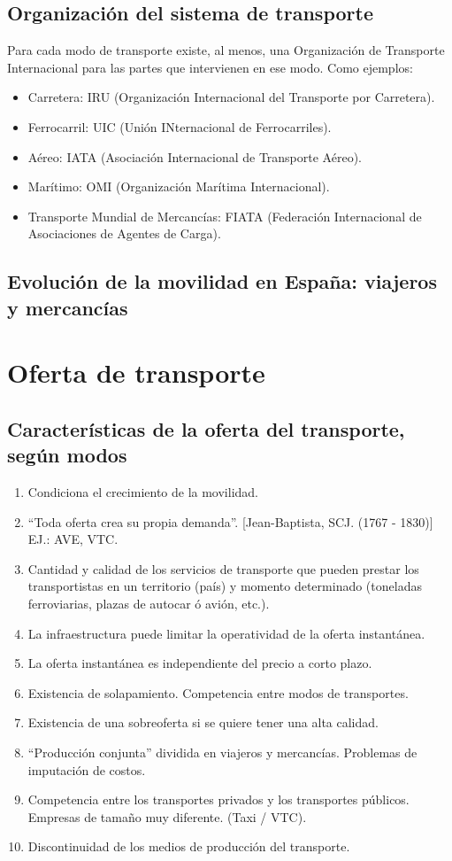 \subsection{Organización del sistema de transporte}
Para cada modo de transporte existe, al menos, una Organización de Transporte Internacional para las partes que intervienen en ese modo. Como ejemplos:
\begin{itemize}
    \item Carretera: IRU (Organización Internacional del Transporte por Carretera).
    \item Ferrocarril: UIC (Unión INternacional de Ferrocarriles).
    \item Aéreo: IATA (Asociación Internacional de Transporte Aéreo).
    \item Marítimo: OMI (Organización Marítima Internacional).
    \item Transporte Mundial de Mercancías: FIATA (Federación Internacional de Asociaciones de Agentes de Carga).
\end{itemize}

\subsection{Evolución de la movilidad en España: viajeros y mercancías}

\section{Oferta de transporte}
\subsection{Características de la oferta del transporte, según modos}
\begin{enumerate}
    \item Condiciona el crecimiento de la movilidad.
    \item ``Toda oferta crea su propia demanda''. [Jean-Baptista, SCJ. (1767 - 1830)] EJ.: AVE, VTC.
    \item Cantidad y calidad de los servicios de transporte que pueden prestar los transportistas en un territorio (país) y momento determinado (toneladas ferroviarias, plazas de autocar ó avión, etc.).
    \item La infraestructura puede limitar la operatividad de la oferta instantánea.
    \item La oferta instantánea es independiente del precio a corto plazo.
    \item Existencia de solapamiento. Competencia entre modos de transportes.
    \item Existencia de una sobreoferta si se quiere tener una alta calidad.
    \item ``Producción conjunta'' dividida en viajeros y mercancías. Problemas de imputación de costos.
    \item Competencia entre los transportes privados y los transportes públicos. Empresas de tamaño muy diferente. (Taxi / VTC).
    \item Discontinuidad de los medios de producción del transporte.
\end{enumerate}

